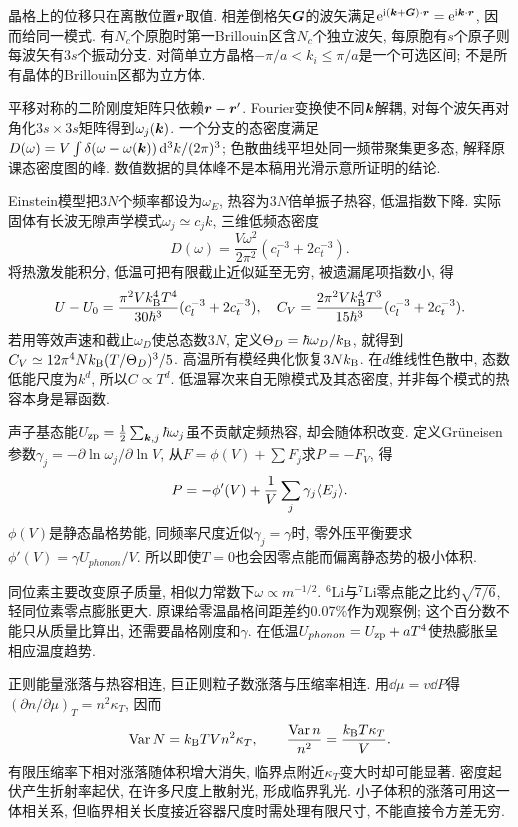 \label{ch:phonon}
晶格上的位移只在离散位置$\boldsymbol{r}$取值. 相差倒格矢$\boldsymbol{G}$的波矢满足$\mathrm e^{\mathrm i(\boldsymbol{k}+\boldsymbol{G})\cdot\boldsymbol{r}}=\mathrm e^{\mathrm i\boldsymbol{k}\cdot\boldsymbol{r}}$, 因而给同一模式. 有$N_c$个原胞时第一Brillouin区含$N_c$个独立波矢, 每原胞有$s$个原子则每波矢有$3s$个振动分支. 对简单立方晶格$-\pi/a<k_i\le\pi/a$是一个可选区间; 不是所有晶体的Brillouin区都为立方体.

平移对称的二阶刚度矩阵只依赖$\boldsymbol{r}-\boldsymbol{r}'$. Fourier变换使不同$\boldsymbol{k}$解耦, 对每个波矢再对角化$3s\times3s$矩阵得到$\omega_j(\boldsymbol{k})$. 一个分支的态密度满足$D(\omega)=V\int\delta(\omega-\omega(\boldsymbol{k}))\,\mathrm d^3k/(2\pi)^3$; 色散曲线平坦处同一频带聚集更多态, 解释原课态密度图的峰. 数值数据的具体峰不是本稿用光滑示意所证明的结论.

Einstein模型把$3N$个频率都设为$\omega_E$, 热容为$3N$倍单振子热容, 低温指数下降. 实际固体有长波无隙声学模式$\omega_j\simeq c_jk$, 三维低频态密度
\[
D(\omega)=\frac{V\omega^2}{2\pi^2}(c_l^{-3}+2c_t^{-3}).
\]
将热激发能积分, 低温可把有限截止近似延至无穷, 被遗漏尾项指数小, 得
\[
U-U_0=\frac{\pi^2Vk_{\mathrm B}^4T^4}{30\hbar^3}(c_l^{-3}+2c_t^{-3}),\quad
C_V=\frac{2\pi^2Vk_{\mathrm B}^4T^3}{15\hbar^3}(c_l^{-3}+2c_t^{-3}).
\]
若用等效声速和截止$\omega_D$使总态数$3N$, 定义$\Theta_D=\hbar\omega_D/k_{\mathrm B}$, 就得到$C_V\simeq12\pi^4Nk_{\mathrm B}(T/\Theta_D)^3/5$. 高温所有模经典化恢复$3Nk_{\mathrm B}$. 在$d$维线性色散中, 态数低能尺度为$k^d$, 所以$C\propto T^d$. 低温幂次来自无隙模式及其态密度, 并非每个模式的热容本身是幂函数.

声子基态能$U_{\rm zp}=\frac12\sum_{\boldsymbol{k},j}\hbar\omega_j$虽不贡献定频热容, 却会随体积改变. 定义Gr\"uneisen参数$\gamma_j=-\partial\ln\omega_j/\partial\ln V$, 从$F=\phi(V)+\sum F_j$求$P=-F_V$, 得
\[
P=-\phi'(V)+\frac1V\sum_j\gamma_j\langle E_j\rangle.
\]
$\phi(V)$是静态晶格势能, 同频率尺度近似$\gamma_j=\gamma$时, 零外压平衡要求$\phi'(V)=\gamma U_{phonon}/V$. 所以即使$T=0$也会因零点能而偏离静态势的极小体积.

同位素主要改变原子质量, 相似力常数下$\omega\propto m^{-1/2}$. ${}^6$Li与${}^7$Li零点能之比约$\sqrt{7/6}$, 轻同位素零点膨胀更大. 原课给零温晶格间距差约0.07\%作为观察例; 这个百分数不能只从质量比算出, 还需要晶格刚度和$\gamma$. 在低温$U_{phonon}=U_{\rm zp}+aT^4$使热膨胀呈相应温度趋势.

正则能量涨落与热容相连, 巨正则粒子数涨落与压缩率相连. 用$\dd\mu=v\dd P$得$(\partial n/\partial\mu)_T=n^2\kappa_T$, 因而
\[
\operatorname{Var} N=k_{\mathrm B} TVn^2\kappa_T,\qquad
\frac{\operatorname{Var} n}{n^2}=\frac{k_{\mathrm B} T\kappa_T}{V}.
\]
有限压缩率下相对涨落随体积增大消失, 临界点附近$\kappa_T$变大时却可能显著. 密度起伏产生折射率起伏, 在许多尺度上散射光, 形成临界乳光. 小子体积的涨落可用这一体相关系, 但临界相关长度接近容器尺度时需处理有限尺寸, 不能直接令方差无穷.

